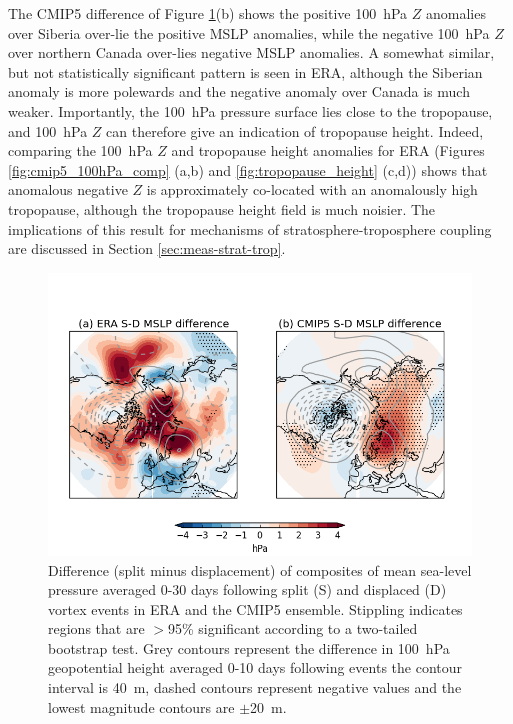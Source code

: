 The CMIP5 difference of Figure \ref{fig:cmip5_mslp_diff}(b) shows the positive
100~hPa $Z$ anomalies over Siberia over-lie the positive MSLP anomalies, while
the negative 100~hPa $Z$ over northern Canada over-lies negative MSLP
anomalies. A somewhat similar, but not statistically significant pattern is seen
in ERA, although the Siberian anomaly is more polewards and the negative anomaly
over Canada is much weaker. Importantly, the 100~hPa pressure surface lies close
to the tropopause, and 100~hPa $Z$ can therefore give an indication of
tropopause height. Indeed, comparing the 100~hPa $Z$ and tropopause height
anomalies for ERA (Figures \ref{fig:cmip5_100hPa_comp} (a,b) and
\ref{fig:tropopause_height} (c,d)) shows that anomalous negative $Z$ is
approximately co-located with an anomalously high tropopause, although the
tropopause height field is much noisier. The implications of this result for
mechanisms of stratosphere-troposphere coupling are discussed in Section
\ref{sec:meas-strat-trop}.



\begin{figure}
 \centering
 \noindent\includegraphics[width=\textwidth]{figures/chapter-models/mslp_diff.png}
 \caption[Difference of MSLP following split and displaced vortex
 events]{Difference (split minus displacement) of composites of mean sea-level
   pressure averaged 0-30 days following split (S) and displaced (D) vortex
   events in ERA and the CMIP5 ensemble. Stippling indicates regions that are
   $>$95\% significant according to a two-tailed bootstrap test. Grey contours
   represent the difference in 100~hPa geopotential height averaged 0-10 days
   following events the contour interval is 40~m, dashed contours represent
   negative values and the lowest magnitude contours are $\pm$20~m. }
 \label{fig:cmip5_mslp_diff}
\end{figure}





